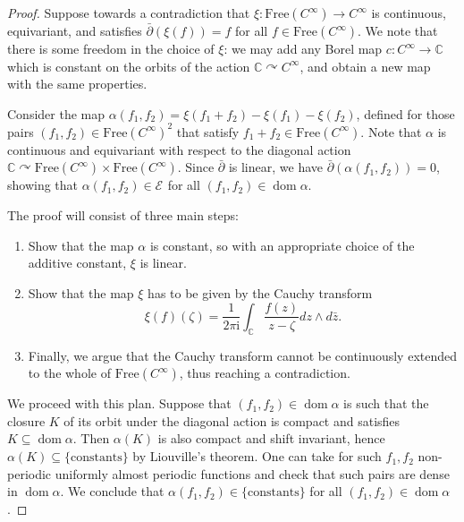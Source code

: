 \documentclass[12pt]{paper}
\numberwithin{equation}{section}
\theoremstyle{plain}
\theoremstyle{definition}
\newcommand{\C}{\mathbb{C}}
\newcommand{\im}{\mathrm{i}} %
\newcommand{\holom}[1][]{\mathcal{E}_{#1}}
\DeclareMathOperator{\dom}{\mathrm{dom}}
\newcommand{\acts}{\curvearrowright}
\newcommand{\free}{\mathrm{Free}}
\begin{document}
\begin{proof}
  Suppose towards a contradiction that \(\xi : \free(C^{\infty}) \to C^{\infty}\) is continuous,
  equivariant, and satisfies \(\bar{\partial}(\xi(f)) = f\) for all \(f \in \free(C^{\infty})\).  We
  note that there is some freedom in the choice of \(\xi\): we may add any Borel map
  \(c:C^\infty\to \C\) which is constant on the orbits of the action \(\C\acts C^\infty\), and
  obtain a new map with the same properties.

  Consider the map \(\alpha(f_{1}, f_{2}) = \xi(f_{1} + f_{2}) - \xi(f_{1}) - \xi(f_{2})\),
  defined for those pairs \((f_{1}, f_{2}) \in \free(C^{\infty})^{2}\) that satisfy
  \(f_{1} + f_{2} \in \free(C^{\infty})\).  Note that \(\alpha\) is continuous and equivariant with
  respect to the diagonal action \(\C \acts \free(C^{\infty}) \times \free(C^{\infty}) \).  Since
  \(\bar{\partial}\) is linear, we have \(\bar{\partial}(\alpha(f_{1}, f_{2})) = 0\), showing that
  \(\alpha(f_{1}, f_{2}) \in \holom\) for all \((f_{1}, f_{2}) \in \dom \alpha\).

  The proof will consist of three main steps:
  \begin{enumerate}[leftmargin=1cm, label={\sf \arabic*}., ref={\sf \arabic*}]
  \item Show that the map \(\alpha\) is constant, so with an appropriate choice of the additive
    constant, \(\xi\) is linear.
  \item Show that the map \(\xi\) has to be given by the Cauchy transform
    \[
      \xi(f)(\zeta) = \frac{1}{2\pi \im} \int_{\C} \frac{f(z)}{z-\zeta} dz \wedge d\bar{z}.
    \]
  \item Finally, we argue that the Cauchy transform cannot be continuously extended to the whole of
    \(\free(C^\infty)\), thus reaching a contradiction.
  \end{enumerate}

  We proceed with this plan. Suppose that \((f_{1}, f_{2}) \in \dom \alpha\) is such that the
  closure \(K\) of its orbit under the diagonal action is compact and satisfies
  \(K \subseteq \dom \alpha\).  Then \(\alpha(K)\) is also compact and shift invariant, hence
  \(\alpha(K) \subseteq \{\textrm{constants}\}\) by Liouville's theorem.  One can take for such
  \(f_{1}, f_{2}\) non-periodic uniformly almost periodic functions and check that such pairs are
  dense in \(\dom \alpha\).  We conclude that \(\alpha(f_{1}, f_{2}) \in \{\textrm{constants}\}\)
  for all \((f_{1}, f_{2}) \in \dom \alpha\).


\end{proof}
\end{document}
